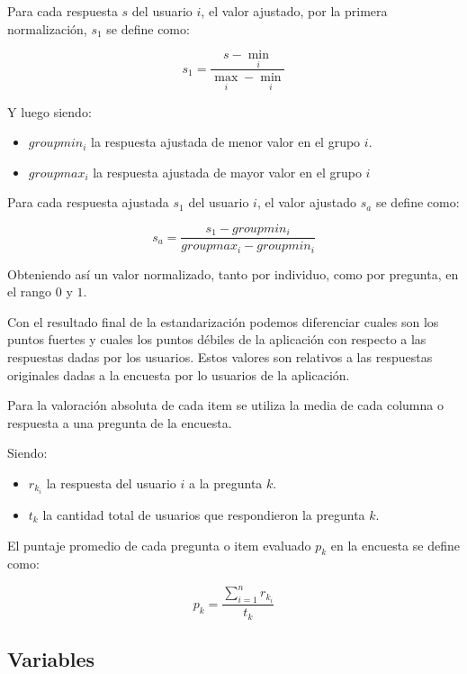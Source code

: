 Para cada respuesta $s$ del usuario $i$, el valor ajustado, por la primera 
normalización, $s_1$ se define como:

\begin{equation*}
s_1=\frac{s-\min_i}{\max_i-\min_i}
\end{equation*}

Y luego siendo:
\begin{itemize}
	\item $groupmin_i$ la respuesta ajustada de menor valor en el grupo $i$.
	\item $groupmax_i$ la respuesta ajustada de mayor valor en el grupo $i$
\end{itemize}

Para cada respuesta ajustada $s_1$ del usuario $i$, el valor ajustado $s_a$ se
define como:	

\begin{equation*}
s_a=\frac{s_1-groupmin_i}{groupmax_i-groupmin_i}
\end{equation*}

Obteniendo así un valor normalizado, tanto por individuo, como por pregunta, en
el rango $0$ y $1$.

Con el resultado final de la estandarización podemos diferenciar cuales son los
puntos fuertes y cuales los puntos débiles de la aplicación con respecto a las
respuestas dadas por los usuarios. Estos valores son relativos a las respuestas
originales dadas a la encuesta por lo usuarios de la aplicación.

Para la valoración absoluta de cada  item se utiliza la media de cada columna o
respuesta a una pregunta de la encuesta.

Siendo:
\begin{itemize} 
\item $r_{k_i}$ la respuesta del usuario $i$ a la pregunta $k$.
\item $t_k$ la cantidad total de usuarios que respondieron la pregunta $k$.
\end{itemize}

El puntaje promedio de cada pregunta o item evaluado  $p_k$ en la encuesta se
define como:

\begin{equation*}
p_k = \frac{\sum_{i=1}^n{r_k_i}}{t_k}
\end{equation*}

\subsection{Variables}
\label{sec:variables}

